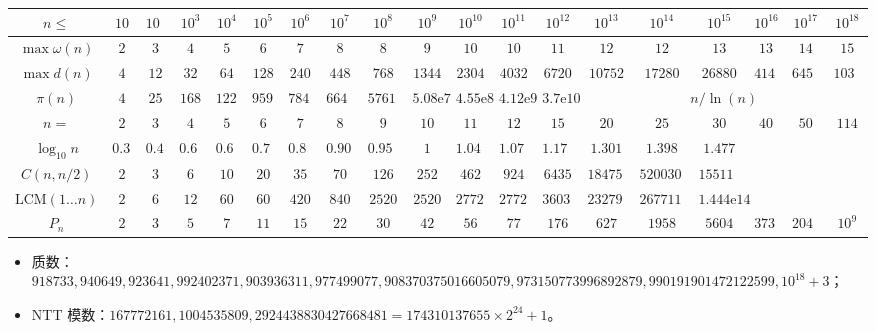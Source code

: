 \def \bangle{\atopwithdelims \langle \rangle}

\begin{table}[H]
	\centering \small \renewcommand{}
	\begin{tabular}{c|c|c|c|c|c|c|c|c|c|c|c|c|c|c|c|c|c|c} \toprule
		$n \leq$ & $10$ & $100$ & $10^{3}$ & $10^{4}$ & $10^{5}$ & $10^{6}$ & $10^{7}$ & $10^{8}$ & $10^{9}$ & $10^{10}$ & $10^{11}$ & $10^{12}$ & $10^{13}$ & $10^{14}$ & $10^{15}$ & $10^{16}$ & $10^{17}$ & $10^{18}$ \\ \midrule
		$\max\omega(n)$ & $2$ & $3$ & $4$ & $5$ & $6$ & $7$ & $8$ & $8$ & $9$ & $10$ & $10$ & $11$ &  $12$ & $12$ & $13$ & $13$ & $14$ & $15$ \\ 
		$\max{d(n)}$ & $4$ & $12$ & $32$ & $64$ & $128$ & $240$ & $ 448$ & $768$ & $1344$ & $2304$ & $4032$ & $6720$ & $10752$ & $17280$ & $26880$ & $41472$ & $64512$ & $103680$ \\ 
		$\pi(n)$ & $4$ & $25$ & $168$ & $1229$ & $9592$ & $78498$ & $664579$ & $5761455$ & $5.08 \mathrm e 7$ & $4.55 \mathrm e 8$ & $4.12 \mathrm e 9$ & $3.7 \mathrm e {10}$ & \multicolumn{6}{c}{$n / \ln(n)$} \\ \midrule
		$n = $ & $2$ & $3$ & $4$ & $5$ & $6$ & $7$ & $8$ & $9$ & $10$ & $11$ & $12$ & $15$ & $20$ & $25$ & $30$ & $40$ & $50$ & $114$ \\ \midrule
		$\log_{10} n$ & $0.301$ & $0.477$ & $0.602$ & $0.698$ & $0.778$ & $0.845$ & $0.903$ & $0.954$ & $1$ & $1.041$ & $1.079$ & $1.176$ & $1.301$ & $1.398$ & $1.477$ \\
		$C(n,n/2)$ & $2$ & $3$ & $6$ & $10$ & $20$ & $35$ & $70$ & $126$ & $252$ & $462$ & $924$ & $6435$ & $184756$ & $5200300$ & $155117520$ \\
		$\mathrm{LCM}(1\dots n)$ & $2$ & $6$ & $12$ & $60$ & $60$ & $420$ & $840$ & $2520$ & $2520$ & $27720$ & $27720$ & $360360$ & $232792560$ & $26771144400$ & $1.444\mathrm e14$ \\ 
		$P_n$ & $2$ & $3$ & $5$ & $7$ & $11$ & $15$ & $22$ & $30$ & $42$ & $56$ & $77$ & $176$ & $627$ & $1958$ & $5604$ & $37338$ & $204226$ & $10^9$ \\ \bottomrule
	\end{tabular}
\end{table}

\tightlist
\begin{itemize}
	\item 质数：$918733, 940649, 923641, 992402371, 903936311, 977499077, 908370375016605079, 973150773996892879, 990191901472122599, 10^{18} + 3$；
	\item NTT 模数：$167772161, 1004535809, 2924438830427668481 = 174310137655 \times 2^{24} + 1$。
\end{itemize}

